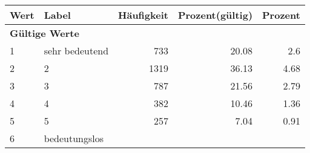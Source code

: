      \begin{longtable}{lXrrr}
     \toprule
     \textbf{Wert} & \textbf{Label} & \textbf{Häufigkeit} & \textbf{Prozent(gültig)} & \textbf{Prozent} \\
     \endhead
     \midrule
     \multicolumn{5}{l}{\textbf{Gültige Werte}}\\

     1 &
     \multicolumn{1}{X}{ sehr bedeutend   } &


       \num{733} &
       \num[round-mode=places,round-precision=2]{20,08} &
         \num[round-mode=places,round-precision=2]{2,6} \\

     2 &
     \multicolumn{1}{X}{ 2   } &


       \num{1319} &
       \num[round-mode=places,round-precision=2]{36,13} &
         \num[round-mode=places,round-precision=2]{4,68} \\

     3 &
     \multicolumn{1}{X}{ 3   } &


       \num{787} &
       \num[round-mode=places,round-precision=2]{21,56} &
         \num[round-mode=places,round-precision=2]{2,79} \\

     4 &
     \multicolumn{1}{X}{ 4   } &


       \num{382} &
       \num[round-mode=places,round-precision=2]{10,46} &
         \num[round-mode=places,round-precision=2]{1,36} \\

     5 &
     \multicolumn{1}{X}{ 5   } &


       \num{257} &
       \num[round-mode=places,round-precision=2]{7,04} &
         \num[round-mode=places,round-precision=2]{0,91} \\

     6 &
     \multicolumn{1}{X}{ bedeutungslos   } &



\end{longtable}
